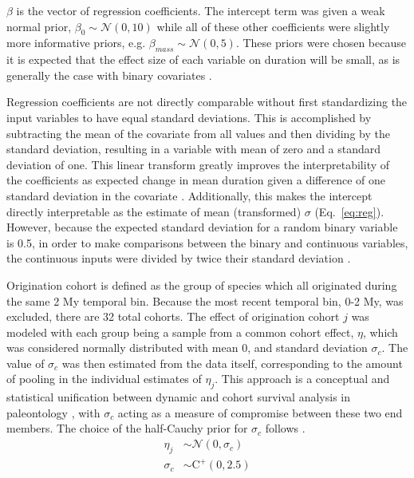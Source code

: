 \documentclass{pnastwo}
\begin{document}
\begin{article}
\begin{materials}
\(\beta\) is the vector of regression coefficients. The intercept term was given a weak normal prior, \(\beta_{0} \sim \mathcal{N}(0, 10)\) while all of these other coefficients were slightly more informative priors, e.g. \(\beta_{mass} \sim \mathcal{N}(0, 5)\). These priors were chosen because it is expected that the effect size of each variable on duration will be small, as is generally the case with binary covariates \cite{Gelman2007}.

Regression coefficients are not directly comparable without first standardizing the input variables to have equal standard deviations. This is accomplished by subtracting the mean of the covariate from all values and then dividing by the standard deviation, resulting in a variable with mean of zero and a standard deviation of one. This linear transform greatly improves the interpretability of the coefficients as expected change in mean duration given a difference of one standard deviation in the covariate \cite{Schielzeth2010}. Additionally, this makes the intercept directly interpretable as the estimate of mean (transformed) \(\sigma\) (Eq.~\ref{eq:reg}). However, because the expected standard deviation for a random binary variable is 0.5, in order to make comparisons between the binary and continuous variables, the continuous inputs were divided by twice their standard deviation \cite{Gelman2008}. 

Origination cohort is defined as the group of species which all originated during the same 2 My temporal bin. Because the most recent temporal bin, 0-2 My, was excluded, there are 32 total cohorts. The effect of origination cohort \(j\) was modeled with each group being a sample from a common cohort effect, \(\eta\), which was considered normally distributed with mean 0, and standard deviation \(\sigma_{c}\). The value of \(\sigma_{c}\) was then estimated from the data itself, corresponding to the amount of pooling in the individual estimates of \(\eta_{j}\). This approach is a conceptual and statistical unification between dynamic and cohort survival analysis in paleontology \cite{Foote1988,Raup1978,Raup1975,VanValen1979,Baumiller1993}, with \(\sigma_{c}\) acting as a measure of compromise between these two end members. The choice of the half-Cauchy prior for \(\sigma_{c}\) follows \cite{Gelman2006a}.
\begin{align*}
  \eta_{j} &\sim \mathcal{N}(0, \sigma_{c}) \\
  \sigma_{c} &\sim \mathrm{C}^{+}(0, 2.5)
\end{align*}


\end{materials}
\end{article}
\end{document}
